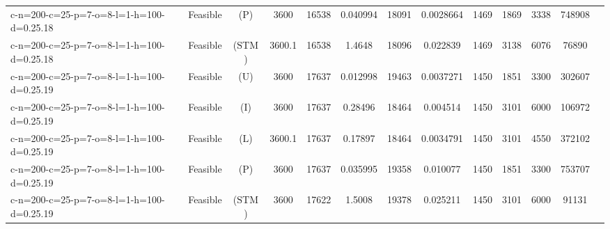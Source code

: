 \documentclass[landscape, a4paper]{article}
\newcommand{\STM}{\ensuremath{\mathrm{STM}}}
\newcommand{\Improved}{\ensuremath{\mathrm{I}}}
\newcommand{\Loose}{\ensuremath{\mathrm{L}}}
\newcommand{\Profit}{\ensuremath{\mathrm{P}}}
\newcommand{\Utility}{\ensuremath{\mathrm{U}}}
\begin{document}
\begin{center}
\begin{tabular}{lcccccccccccc}
c-n=200-c=25-p=7-o=8-l=1-h=100-d=0.25.18 & Feasible & (\Profit) & 3600 & 16538 & 0.040994 & 18091 & 0.0028664 & 1469 & 1869 & 3338 & 748908 & \\
c-n=200-c=25-p=7-o=8-l=1-h=100-d=0.25.18 & Feasible & (\STM) & 3600.1 & 16538 & 1.4648 & 18096 & 0.022839 & 1469 & 3138 & 6076 & 76890 & \\
c-n=200-c=25-p=7-o=8-l=1-h=100-d=0.25.19 & Feasible & (\Utility) & 3600 & 17637 & 0.012998 & 19463 & 0.0037271 & 1450 & 1851 & 3300 & 302607 & \\
c-n=200-c=25-p=7-o=8-l=1-h=100-d=0.25.19 & Feasible & (\Improved) & 3600 & 17637 & 0.28496 & 18464 & 0.004514 & 1450 & 3101 & 6000 & 106972 & \\
c-n=200-c=25-p=7-o=8-l=1-h=100-d=0.25.19 & Feasible & (\Loose) & 3600.1 & 17637 & 0.17897 & 18464 & 0.0034791 & 1450 & 3101 & 4550 & 372102 & \\
c-n=200-c=25-p=7-o=8-l=1-h=100-d=0.25.19 & Feasible & (\Profit) & 3600 & 17637 & 0.035995 & 19358 & 0.010077 & 1450 & 1851 & 3300 & 753707 & \\
c-n=200-c=25-p=7-o=8-l=1-h=100-d=0.25.19 & Feasible & (\STM) & 3600 & 17622 & 1.5008 & 19378 & 0.025211 & 1450 & 3101 & 6000 & 91131 & \\
\end{tabular}
\end{center}
\end{document}
